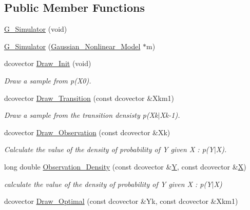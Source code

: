 \subsection*{Public Member Functions}
\begin{CompactItemize}
\item 
\hyperlink{class_g___simulator_f73fe624aee09a345b153b9c2fe7a8a5}{G\_\-Simulator} (void)
\item 
\hyperlink{class_g___simulator_a42df6b23b83676a63e0afb6e765ea5e}{G\_\-Simulator} (\hyperlink{class_gaussian___nonlinear___model}{Gaussian\_\-Nonlinear\_\-Model} $\ast$m)
\item 
dcovector \hyperlink{class_g___simulator_0e9a1d220c5457cc07c6bcdb70e1638c}{Draw\_\-Init} (void)
\begin{CompactList}\small\item\em Draw a sample from p(X0). \item\end{CompactList}\item 
dcovector \hyperlink{class_g___simulator_54563826e17b08d4cf66090731797888}{Draw\_\-Transition} (const dcovector \&Xkm1)
\begin{CompactList}\small\item\em Draw a sample from the transition densisty p(Xk$|$Xk-1). \item\end{CompactList}\item 
dcovector \hyperlink{class_g___simulator_b53bc573683cef16a5117dcc71a1f0a7}{Draw\_\-Observation} (const dcovector \&Xk)
\begin{CompactList}\small\item\em Calculate the value of the density of probability of Y given X : p(Y$|$X). \item\end{CompactList}\item 
long double \hyperlink{class_g___simulator_6f42783322c20a0b91fab9f1e6d54363}{Observation\_\-Density} (const dcovector \&\hyperlink{class_simulator_403a127c909abf3e4c6d48a287315987}{Y}, const dcovector \&\hyperlink{class_simulator_a2db8ace19099d996be516022d230bc0}{X})
\begin{CompactList}\small\item\em calculate the value of the density of probability of Y given X : p(Y$|$X) \item\end{CompactList}\item 
dcovector \hyperlink{class_g___simulator_b6c78e1dfa62c8c684b860ea1918f045}{Draw\_\-Optimal} (const dcovector \&Yk, const dcovector \&Xkm1)

\end{CompactItemize}
